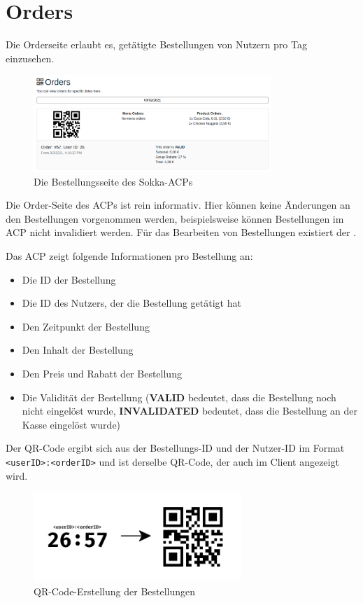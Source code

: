 \section{Orders}

Die Orderseite erlaubt es, getätigte Bestellungen von Nutzern pro Tag einzusehen.

\begin{figure}[ht]
    \centering
    \includegraphics[width=0.8\textwidth]{images/ACP/orders.png}
    \caption{Die Bestellungsseite des Sokka-ACPs}
\end{figure}

Die Order-Seite des ACPs ist rein informativ. Hier können keine Änderungen an den Bestellungen vorgenommen werden, beispielsweise können Bestellungen im ACP nicht invalidiert werden. Für das Bearbeiten von Bestellungen existiert der \textit{}.

Das ACP zeigt folgende Informationen pro Bestellung an:

\begin{itemize}
    \item Die ID der Bestellung
    \item Die ID des Nutzers, der die Bestellung getätigt hat
    \item Den Zeitpunkt der Bestellung
    \item Den Inhalt der Bestellung
    \item Den Preis und Rabatt der Bestellung
    \item Die Validität der Bestellung (\textbf{VALID} bedeutet, dass die Bestellung noch nicht eingelöst wurde, \textbf{INVALIDATED} bedeutet, dass die Bestellung an der Kasse eingelöst wurde)
\end{itemize}

Der QR-Code ergibt sich aus der Bestellungs-ID und der Nutzer-ID im Format \lstinline{<userID>:<orderID>} und ist derselbe QR-Code, der auch im Client angezeigt wird.

\begin{figure}[ht]
    \centering
    \includegraphics[width=0.7\textwidth]{images/ACP/arrow.png}
    \caption{QR-Code-Erstellung der Bestellungen}
\end{figure}